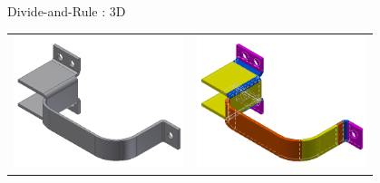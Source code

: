 \documentclass[final]{beamer}
\newlength{\onecolumnwidth}
\begin{document}
\begin{frame}[t]
\begin{columns}[t]
\begin{column}{\onecolumnwidth}
	\begin{block}{Divide-and-Rule : 3D}
		\begin{center}
		\begin{tabular}[h]{@{}p{0.4\linewidth} p{0.4\linewidth} @{}} 
		
			\includegraphics[width=0.8\linewidth]{../Common/images/nonCellularBracket}  &  
			\includegraphics[width=0.8\linewidth]{../Common/images/CellularBracket}  \\
			

\end{tabular}
\end{center}
\end{block}
\end{column}
\end{columns}
\end{frame}
\end{document}
